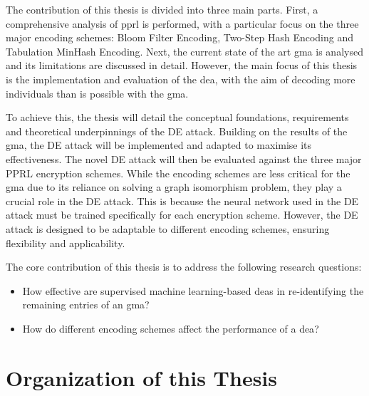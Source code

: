 The contribution of this thesis is divided into three main parts.
First, a comprehensive analysis of \ac{pprl} is performed, with a particular focus on the three major encoding schemes: Bloom Filter Encoding, Two-Step Hash Encoding and Tabulation MinHash Encoding.
Next, the current state of the art \ac{gma} is analysed and its limitations are discussed in detail.
However, the main focus of this thesis is the implementation and evaluation of the \ac{dea}, with the aim of decoding more individuals than is possible with the \ac{gma}.

To achieve this, the thesis will detail the conceptual foundations, requirements and theoretical underpinnings of the DE attack.
Building on the results of the \ac{gma}, the DE attack will be implemented and adapted to maximise its effectiveness.
The novel DE attack will then be evaluated against the three major PPRL encryption schemes.
While the encoding schemes are less critical for the \ac{gma} due to its reliance on solving a graph isomorphism problem, they play a crucial role in the DE attack.
This is because the neural network used in the DE attack must be trained specifically for each encryption scheme.
However, the DE attack is designed to be adaptable to different encoding schemes, ensuring flexibility and applicability.

The core contribution of this thesis is to address the following research questions:

\begin{itemize}
    \item How effective are supervised machine learning-based \ac{dea}s in re-identifying the remaining entries of an \ac{gma}?
    \item How do different encoding schemes affect the performance of a \ac{dea}?
\end{itemize}



\section{Organization of this Thesis}  \label{sec:orga}

